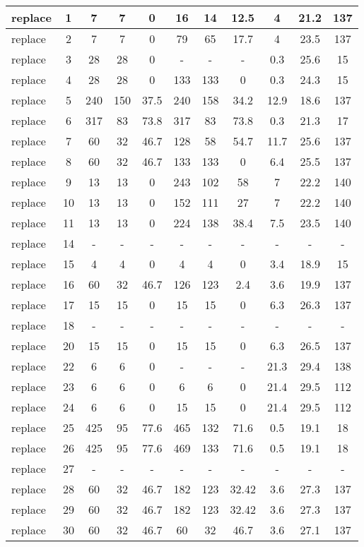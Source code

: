 {\begin{table*}
\begin{CodeOut}
\begin{center}
\begin {tabular} {|l|c|c|c|c|c|c|c|c|c|c|}
\hline
\hline replace &1&7&7&0&16&14&12.5&4&21.2&137\\
\hline replace &2&7&7&0&79&65&17.7&4&23.5&137\\
\hline replace &3&28&28&0&-&-&-&0.3&25.6&15\\
\hline replace &4&28&28&0&133&133&0&0.3&24.3&15\\
\hline replace &5&240&150&37.5&240&158&34.2&12.9&18.6&137\\
\hline replace &6&317&83&73.8&317&83&73.8&0.3&21.3&17\\
\hline replace &7&60&32&46.7&128&58&54.7&11.7&25.6&137\\
\hline replace &8&60&32&46.7&133&133&0&6.4&25.5&137\\
\hline replace &9&13&13&0&243&102&58&7&22.2&140\\
\hline replace &10&13&13&0&152&111&27&7&22.2&140\\
\hline replace &11&13&13&0&224&138&38.4&7.5&23.5&140\\
\hline replace &14&-&-&-&-&-&-&-&-&-\\
\hline replace &15&4&4&0&4&4&0&3.4&18.9&15\\
\hline replace &16&60&32&46.7&126&123&2.4&3.6&19.9&137\\
\hline replace &17&15&15&0&15&15&0&6.3&26.3&137\\
\hline replace &18&-&-&-&-&-&-&-&-&-\\
\hline replace &20&15&15&0&15&15&0&6.3&26.5&137\\
\hline replace &22&6&6&0&-&-&-&21.3&29.4&138\\
\hline replace &23&6&6&0&6&6&0&21.4&29.5&112\\
\hline replace &24&6&6&0&15&15&0&21.4&29.5&112\\
\hline replace &25&425&95&77.6&465&132&71.6&0.5&19.1&18\\
\hline replace &26&425&95&77.6&469&133&71.6&0.5&19.1&18\\
\hline replace &27&-&-&-&-&-&-&-&-&-\\
\hline replace &28&60&32&46.7&182&123&32.42&3.6&27.3&137\\
\hline replace &29&60&32&46.7&182&123&32.42&3.6&27.3&137\\
\hline replace &30&60&32&46.7&60&32&46.7&3.6&27.1&137\\

\end{tabular}
\end{center}
\end{CodeOut}
\end{table*}}
